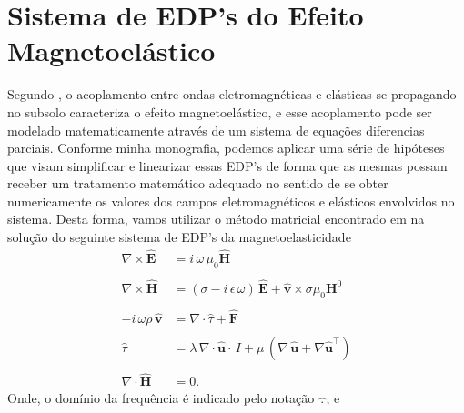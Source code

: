\section{Sistema de EDP's do Efeito Magnetoel\'astico}

Segundo \cite{eringen_1963}, o acoplamento entre ondas eletromagn\'eticas e el\'asticas se propagando no subsolo caracteriza o efeito magnetoel\'astico, e esse acoplamento pode ser modelado matematicamente atrav\'es de um sistema de equa\c{c}\~oes diferencias parciais. Conforme minha monografia, podemos aplicar uma s\'erie de hip\'oteses que visam simplificar e linearizar essas EDP's de forma que as mesmas possam receber um tratamento matem\'atico adequado no sentido de se obter numericamente os valores dos campos eletromagn\'eticos e el\'asticos envolvidos no sistema. Desta forma, vamos utilizar o m\'etodo matricial encontrado em \cite{Ursin-1983} na solu\c{c}\~ao do seguinte sistema de EDP's da magnetoelasticidade
\begin{align*}
\nabla\times\mathbf{\widehat{E}}&=i\,\omega\,\mu_0\mathbf{\widehat{H}}\\\\
\nabla\times\mathbf{\widehat{H}}&=(\sigma-i\,\epsilon\,\omega)\,\mathbf{\widehat{E}}+\mathbf{\widehat{v}}\times\sigma\mu_0\mathbf{H}^0\\\\
-i\,\omega\rho\,\mathbf{\widehat{v}}&=\nabla\cdot\widehat{\tau} + \mathbf{\widehat{F}}\\\\
\widehat{\tau}&=\lambda\,\nabla\cdot\mathbf{\widehat{u}}\cdot\,I + \mu\,(\nabla\,\mathbf{\widehat{u}}+\nabla\mathbf{\widehat{u}}^\top)\\\\
\nabla\cdot\mathbf{\widehat{H}}&=0.
\end{align*}
Onde, o dom\'inio da frequ\^encia \'e indicado pelo nota\c{c}\~ao $\widehat{\,.\,}$, e 
